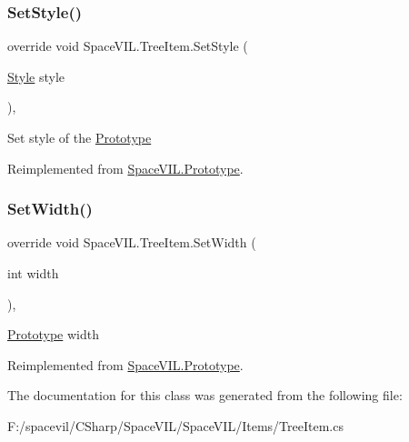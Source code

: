 \subsubsection{\texorpdfstring{Set\+Style()}{SetStyle()}}
{\footnotesize\ttfamily override void Space\+V\+I\+L.\+Tree\+Item.\+Set\+Style (\begin{DoxyParamCaption}\item[{\mbox{\hyperlink{class_space_v_i_l_1_1_decorations_1_1_style}{Style}}}]{style }\end{DoxyParamCaption})\hspace{0.3cm}{\ttfamily [inline]}, {\ttfamily [virtual]}}



Set style of the \mbox{\hyperlink{class_space_v_i_l_1_1_prototype}{Prototype}} 



Reimplemented from \mbox{\hyperlink{class_space_v_i_l_1_1_prototype_ae96644a6ace490afb376fb542161e541}{Space\+V\+I\+L.\+Prototype}}.

\mbox{\label{class_space_v_i_l_1_1_tree_item_aa10abe8a9dafe4d597e041500618ec03}} 
\subsubsection{\texorpdfstring{Set\+Width()}{SetWidth()}}
{\footnotesize\ttfamily override void Space\+V\+I\+L.\+Tree\+Item.\+Set\+Width (\begin{DoxyParamCaption}\item[{int}]{width }\end{DoxyParamCaption})\hspace{0.3cm}{\ttfamily [inline]}, {\ttfamily [virtual]}}



\mbox{\hyperlink{class_space_v_i_l_1_1_prototype}{Prototype}} width 



Reimplemented from \mbox{\hyperlink{class_space_v_i_l_1_1_prototype_a6a4f1b9581f4d18f1c3a3e287d4b2a2b}{Space\+V\+I\+L.\+Prototype}}.



The documentation for this class was generated from the following file\+:\begin{DoxyCompactItemize}
\item 
F\+:/spacevil/\+C\+Sharp/\+Space\+V\+I\+L/\+Space\+V\+I\+L/\+Items/Tree\+Item.\+cs\end{DoxyCompactItemize}
